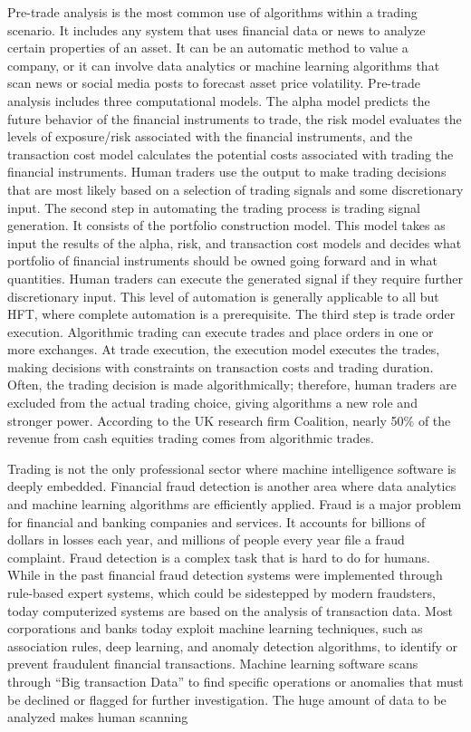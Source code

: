 {\baselineskip=14.35pt Pre-trade analysis is the most common use of algorithms within a trading scenario. It includes any system that uses financial data or news to analyze certain properties of an asset. It can be an automatic method to value a company, or it can involve data analytics or machine learning algorithms that scan news or social media posts to forecast asset price volatility. Pre-trade analysis includes three computational models. The alpha model predicts the future behavior of the financial instruments to trade, the risk model evaluates the levels of exposure/{\allowbreak}risk associated with the financial instruments, and the transaction cost model calculates the potential costs associated with trading the financial instruments. Human traders use the output to make trading decisions that are most likely based on a selection of trading signals and some discretionary input. The second step in automating the trading process is trading signal generation. It consists of the portfolio construction model. This model takes as input the results of the alpha, risk, and transaction cost models and decides what portfolio of financial instruments should be owned going forward and in what quantities. Human traders can execute the generated signal if they require further discretionary input. This level of automation is generally applicable to all but HFT, where complete automation is a prerequisite. The third step is trade order execution. Algorithmic trading can execute trades and place orders in one or more exchanges. At trade execution, the execution model executes the trades, making decisions with constraints on transaction costs and trading duration. Often, the trading decision is made algorithmically; therefore, human traders are excluded from the actual trading choice, giving algorithms a new role and stronger power. According to the UK research firm Coalition, nearly 50\% of the revenue from cash equities trading comes from algorithmic trades.

Trading is not the only professional sector where machine intelligence software is deeply embedded. Financial fraud detection is another area where data analytics and machine learning algorithms are efficiently applied. Fraud is a major problem for financial and banking companies and services. It accounts for billions of dollars in losses each year, and millions of people every year file a fraud complaint. Fraud detection is a complex task that is hard to do for humans. While in the past financial fraud detection systems were implemented through rule-based expert systems, which could be sidestepped by modern fraudsters, today computerized systems are based on the analysis of transaction data. Most corporations and banks today exploit machine learning techniques, such as association rules, deep learning, and anomaly detection algorithms, to identify or prevent fraudulent financial transactions. Machine learning software scans through ``Big transaction Data'' to find specific operations or anomalies that must be declined or flagged for further investigation. The huge amount of data to be analyzed makes human scanning\vspace*{-14pt}\break\par}


